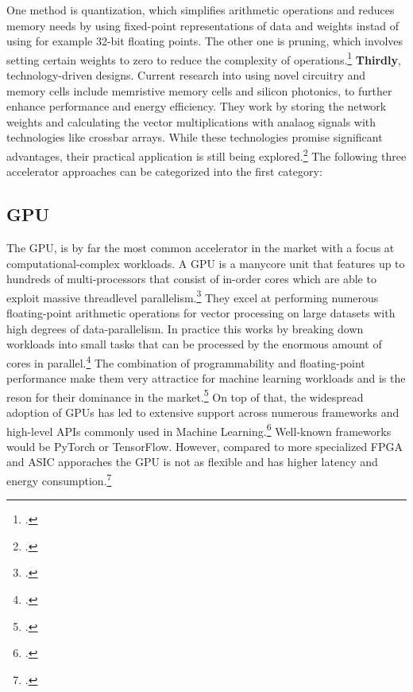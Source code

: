 One method is quantization, which simplifies arithmetic operations and reduces memory needs by using fixed-point representations of data and weights instad of using for example 32-bit floating points.
The other one is pruning, which involves setting certain weights to zero to reduce the complexity of operations.\footcite[cf.][3883]{lehnertMostResourceEfficient2023}
\textbf{Thirdly}, technology-driven designs.
Current research into using novel circuitry and memory cells include memristive memory cells and silicon photonics, to further enhance performance and energy efficiency.
They work by storing the network weights and calculating the vector multiplications with analaog signals with technologies like crossbar arrays.
While these technologies promise significant advantages, their practical application is still being explored.\footcite[cf.][3883]{lehnertMostResourceEfficient2023}
The following three accelerator approaches can be categorized into the first category:

\subsection{GPU}
The \ac{GPU}, is by far the most common accelerator in the market with a focus at computational-complex workloads.
A \ac{GPU} is a manycore unit that features up to hundreds of multi-processors that consist of in-order cores which are able to exploit massive threadlevel parallelism.\footcite[cf.][2]{peccerilloSurveyHardwareAccelerators2022}
They excel at performing numerous floating-point arithmetic operations for vector processing on large datasets with high degrees of data-parallelism.
In practice this works by breaking down workloads into small tasks that can be processed by the enormous amount of cores in parallel.\footcite[cf.][101]{huSurveyConvolutionalNeural2022} 
The combination of programmability and floating-point performance
make them very attractice for machine learning workloads and is the reson for their dominance in the market.\footcite[cf.][42]{dallyEvolutionGraphicsProcessing2021}
On top of that, the widespread adoption of \ac{GPU}s has led to extensive support across numerous frameworks and high-level APIs commonly used in Machine Learning.\footcite[cf.][16]{baischerLearningHardwareTutorial2021}
Well-known frameworks would be PyTorch or TensorFlow.
However, compared to more specialized \ac{FPGA} and \ac{ASIC} apporaches the \ac{GPU} is not as flexible and has higher latency and energy consumption.\footcite[cf.][100]{huSurveyConvolutionalNeural2022}

